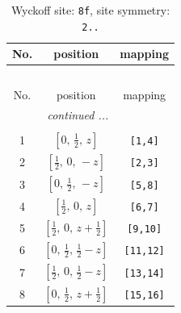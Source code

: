 \documentclass[fleqn,8pt]{jsarticle}
\begin{document}
\begin{longtable}{ccc}
\caption{Wyckoff site: {\tt 8f}, site symmetry: {\tt 2..}}
 \\
 \hline \hline
No. & position & mapping \\ \hline \endfirsthead

\multicolumn{2}{l}{\tablename\ \thetable{}} \\
 \hline \hline
No. & position & mapping \\ \hline \endhead

 \hline \hline
\multicolumn{2}{r}{\footnotesize\it continued ...} \\ \endfoot

 \hline \hline
\multicolumn{2}{r}{} \\ \endlastfoot

1 & $\left[ 0,\, \frac{1}{2},\, z \right]$ & {\tt [1,4]} \\ \hline
2 & $\left[ \frac{1}{2},\, 0,\, - z \right]$ & {\tt [2,3]} \\ \hline
3 & $\left[ 0,\, \frac{1}{2},\, - z \right]$ & {\tt [5,8]} \\ \hline
4 & $\left[ \frac{1}{2},\, 0,\, z \right]$ & {\tt [6,7]} \\ \hline
5 & $\left[ \frac{1}{2},\, 0,\, z + \frac{1}{2} \right]$ & {\tt [9,10]} \\ \hline
6 & $\left[ 0,\, \frac{1}{2},\, \frac{1}{2} - z \right]$ & {\tt [11,12]} \\ \hline
7 & $\left[ \frac{1}{2},\, 0,\, \frac{1}{2} - z \right]$ & {\tt [13,14]} \\ \hline
8 & $\left[ 0,\, \frac{1}{2},\, z + \frac{1}{2} \right]$ & {\tt [15,16]} \\
\end{longtable}
\renewcommand{\arraystretch}{1.2}
\end{document}
